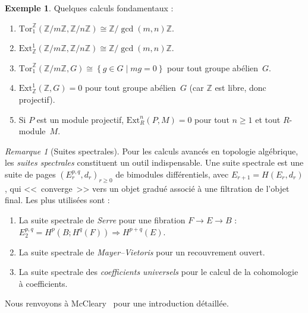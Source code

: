 \documentclass[12pt,a4paper,openany]{book}
\theoremstyle{definition}
\newtheorem{exemple}[definition]{Exemple}
\theoremstyle{plain}
\theoremstyle{remark}
\newtheorem{remarque}[definition]{Remarque}
\newcommand{\Z}{\mathbb{Z}}
\newcommand{\set}[1]{\left\{#1\right\}}
\begin{document}
\begin{exemple}\label{ex:ext-tor-calculs}
  Quelques calculs fondamentaux :
  \begin{enumerate}[label=(\roman*)]
    \item $\mathrm{Tor}_1^\Z(\Z/m\Z, \Z/n\Z) \cong \Z/\gcd(m,n)\Z$.
    \item $\mathrm{Ext}^1_\Z(\Z/m\Z, \Z/n\Z) \cong \Z/\gcd(m,n)\Z$.
    \item $\mathrm{Tor}_1^\Z(\Z/m\Z, G) \cong \set{g \in G \mid mg = 0}$
          pour tout groupe abélien~$G$.
    \item $\mathrm{Ext}^1_\Z(\Z, G) = 0$ pour tout groupe abélien~$G$
          (car $\Z$ est libre, donc projectif).
    \item Si $P$ est un module projectif, $\mathrm{Ext}^n_R(P, M) = 0$ pour tout
          $n \geq 1$ et tout $R$-module~$M$.
  \end{enumerate}
\end{exemple}

\begin{remarque}[Suites spectrales]\label{rem:suites-spectrales}
  Pour les calculs avancés en topologie algébrique, les \emph{suites spectrales}
  constituent un outil indispensable. Une suite spectrale est une suite de pages
  $(E_r^{p,q}, d_r)_{r \geq 0}$ de bimodules différentiels, avec
  $E_{r+1} = H(E_r, d_r)$, qui <<~converge~>> vers un objet gradué associé à une
  filtration de l'objet final. Les plus utilisées sont :
  \begin{enumerate}[label=(\roman*)]
    \item La suite spectrale de \emph{Serre}
          pour une fibration $F \to E \to B$ :
          $E_2^{p,q} = H^p(B; H^q(F)) \Rightarrow H^{p+q}(E)$.
    \item La suite spectrale de \emph{Mayer--Vietoris}
          pour un recouvrement ouvert.
    \item La suite spectrale des \emph{coefficients universels} pour le calcul
          de la cohomologie à coefficients.
  \end{enumerate}
  Nous renvoyons à McCleary~\cite{weibel} pour une introduction détaillée.
\end{remarque}

\end{document}
